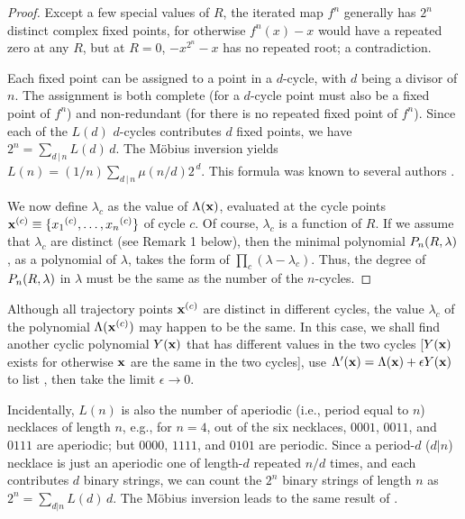 \documentclass[twocolumn]{revtex4-1}
\begin{document}
\begin{proof}
%
Except a few special values of $R$,
the iterated map $f^{n}$ generally
has $2^n$ distinct complex fixed points,
%
for otherwise $f^{n}(x) - x$ would have a repeated zero at any $R$,
  but at $R=0$, $-x^{2^n} - x$ has no repeated root; a contradiction.


Each fixed point can be assigned to
  a point in a $d$-cycle, with $d$ being a divisor of $n$.
%
The assignment
  is both complete (for a $d$-cycle point
  must also be a fixed point of $f^n$)
  and non-redundant (for there is no
  repeated fixed point of $f^n$).
%
Since each of the $L(d)$ $d$-cycles
  contributes $d$ fixed points,
we have
$2^n = \sum_{d\,|\,n} L(d) \, d$.
%
The M\"obius inversion yields $L(n) = (1/n) \sum_{d\,|\,n} \mu(n/d) 2^{\,d}$.
This formula was known to several authors \cite{hao2, lutzky}.

We now define $\lambda_c$ as the value of $\Lambda(\mathbf{x})$,
  evaluated at the cycle points
  $\mathbf{x}^{(c)} \equiv \{ {x_1}^{(c)}, \ldots, {x_n}^{(c)} \}$
  of cycle $c$.
Of course, $\lambda_c$ is a function of $R$.
If we assume that $\lambda_c$ are distinct (see Remark 1 below),
  then the minimal polynomial $P_n(R, \lambda)$,
  as a polynomial of $\lambda$,
  takes the form of $\prod_c (\lambda - \lambda_c)$.
Thus, the degree of $P_n(R, \lambda)$ in $\lambda$
  must be the same as the number of the $n$-cycles.
\end{proof}

\begin{remark}[1]
Although all trajectory points $\mathbf{x}^{(c)}$ are distinct in
  different cycles,
the value $\lambda_c$ of the polynomial $\Lambda(\mathbf{x}^{(c)})$
  may happen to be the same.
In this case,
  we shall find another cyclic polynomial $Y(\mathbf{x})$ that
  has different values in the two cycles
  [$Y(\mathbf{x})$ exists for otherwise $\mathbf{x}$ are the same in the two cycles],
  use $\Lambda'(\mathbf{x}) = \Lambda(\mathbf{x}) + \epsilon Y(\mathbf{x})$
  to list ,
  then take the limit
  $\epsilon \rightarrow 0$.
\end{remark}


\begin{remark}[2]
Incidentally, $L(n)$ is also the number of aperiodic (i.e., period equal to $n$)
  necklaces of length $n$,
  e.g., for $n = 4$,
  out of the six necklaces, $0001$, $0011$, and $0111$ are aperiodic;
  but $0000$, $1111$, and $0101$ are periodic.
%
Since a period-$d$ ($d|n$) necklace is just an aperiodic one
  of length-$d$ repeated $n/d$ times,
and each contributes $d$ binary strings,
we can count the $2^n$ binary strings of length $n$ as
  $2^n = \sum_{d|n} L(d) \, d$.
The M\"obius inversion leads to the same result of .
\end{remark}
\end{document}

